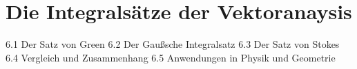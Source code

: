 \chapter{Die Integralsätze der Vektoranaysis}



6.1 Der Satz von Green
6.2 Der Gaußsche Integralsatz
6.3 Der Satz von Stokes
6.4 Vergleich und Zusammenhang
6.5 Anwendungen in Physik und Geometrie
